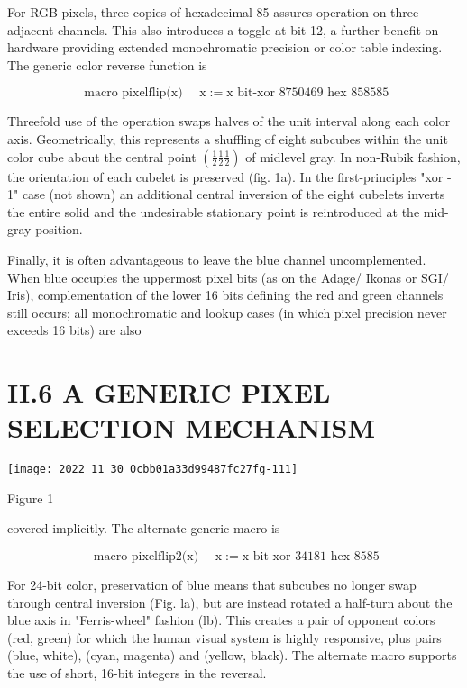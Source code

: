 \begin{CJK}{UTF8}{gbsn}
For RGB pixels, three copies of hexadecimal 85 assures operation on three adjacent channels. This also introduces a toggle at bit 12, a further benefit on hardware providing extended monochromatic precision or color table indexing. The generic color reverse function is

$$
\text { macro pixelflip(x) } \quad \mathrm{x}:=\mathrm{x} \text { bit-xor } 8750469 \text { hex } 858585
$$

Threefold use of the operation swaps halves of the unit interval along each color axis. Geometrically, this represents a shuffling of eight subcubes within the unit color cube about the central point $\left(\frac{1}{2} \frac{1}{2} \frac{1}{2}\right)$ of midlevel gray. In non-Rubik fashion, the orientation of each cubelet is preserved (fig. 1a). In the first-principles "xor - 1" case (not shown) an additional central inversion of the eight cubelets inverts the entire solid and the undesirable stationary point is reintroduced at the mid-gray position.

Finally, it is often advantageous to leave the blue channel uncomplemented. When blue occupies the uppermost pixel bits (as on the Adage/ Ikonas or SGI/ Iris), complementation of the lower 16 bits defining the red and green channels still occurs; all monochromatic and lookup cases (in which pixel precision never exceeds 16 bits) are also

\section{II.6 A GENERIC PIXEL SELECTION MECHANISM}
\begin{center}
\texttt{[image: 2022\_11\_30\_0cbb01a33d99487fc27fg-111]}
\end{center}

Figure 1

covered implicitly. The alternate generic macro is

$$
\text { macro pixelflip2(x) } \quad \mathrm{x}:=\mathrm{x} \text { bit-xor } 34181 \text { hex } 8585
$$

For 24-bit color, preservation of blue means that subcubes no longer swap through central inversion (Fig. la), but are instead rotated a half-turn about the blue axis in "Ferris-wheel" fashion (lb). This creates a pair of opponent colors (red, green) for which the human visual system is highly responsive, plus pairs (blue, white), (cyan, magenta) and (yellow, black). The alternate macro supports the use of short, 16-bit integers in the reversal.


\end{CJK}
